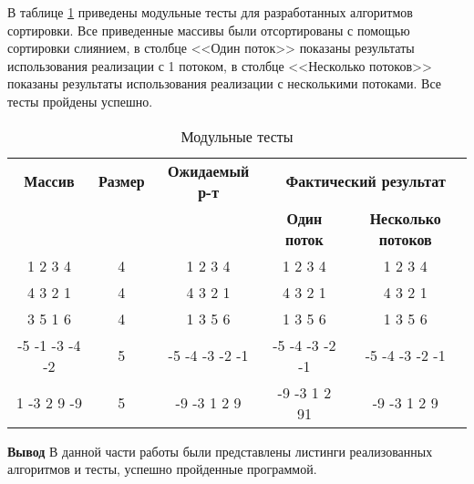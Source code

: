 В таблице \ref{t:mod_tests} приведены модульные  тесты для разработанных алгоритмов сортировки. Все приведенные массивы были отсортированы с помощью сортировки слиянием, в столбце <<Один поток>>
показаны результаты использования реализации с 1 потоком,  в столбце <<Несколько потоков>> показаны результаты использования реализации с несколькими потоками. Все тесты пройдены успешно.
\begin{table}[ht]
	\small
	\begin{center}
		\begin{threeparttable}
			\caption{Модульные тесты}
			\label{t:mod_tests}
			\begin{tabular}{|c|c|c|c|c|}
				\hline
				\bfseries Массив
				& \bfseries Размер
				& \bfseries Ожидаемый р-т
				& \multicolumn{2}{c|}{\bfseries Фактический результат} \\ \cline{4-5}
				& & & \bfseries Один поток & \bfseries  Несколько потоков \\
				\hline
				1 2 3 4  & 4 & 1 2 3 4 & 1 2 3 4 & 1 2 3 4 \\
				\hline
				4 3 2 1 & 4 & 4 3 2 1 & 4 3 2 1 & 4 3 2 1 \\
				\hline
				3 5 1 6 & 4 & 1 3 5 6  & 1 3 5 6 & 1 3 5 6 \\
				\hline
				-5 -1 -3 -4 -2 & 5 & -5 -4 -3 -2 -1 & -5 -4 -3 -2 -1 & -5 -4 -3 -2 -1 \\
				\hline
				1 -3 2 9 -9 & 5 & -9 -3 1 2 9  & -9 -3 1 2 91 & -9 -3 1 2 9 \\
				\hline
			\end{tabular}	
		\end{threeparttable}	
	\end{center}
\end{table}


\textbf{Вывод}
 В данной части работы были представлены листинги реализованных алгоритмов и тесты, успешно пройденные программой.
